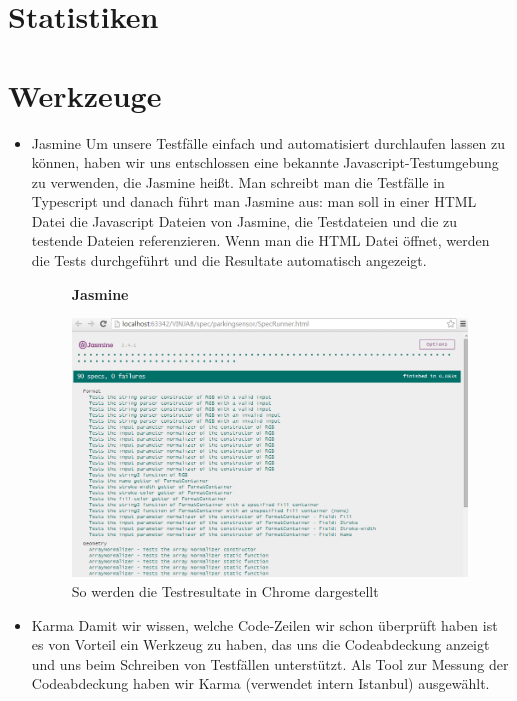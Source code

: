\documentclass[qualitaetssicherung.tex]{subfiles}
\begin{document}
\section{Statistiken}\label{statistiken}
\section{Werkzeuge}\label{werkzeuge}
\begin{itemize}
	\item

	Jasmine\newline	
	Um unsere Testfälle einfach und automatisiert durchlaufen lassen zu können, haben wir uns entschlossen eine bekannte Javascript-Testumgebung zu verwenden, die Jasmine heißt. Man schreibt man die Testfälle in Typescript und danach führt man Jasmine aus: man soll in einer HTML Datei die Javascript Dateien von Jasmine, die Testdateien und die zu testende Dateien referenzieren. Wenn man die HTML Datei öffnet, werden die Tests durchgeführt und die Resultate automatisch angezeigt.
	
	\begin{figure}
    \textbf{Jasmine}\par\medskip
    \includegraphics[width=0.99\textwidth]{Images/jasmine-example.png}
    \caption{So werden die Testresultate in Chrome dargestellt}
	\end{figure}
	
	\item
	Karma\newline
	Damit wir wissen, welche Code-Zeilen wir schon überprüft haben ist es von Vorteil ein Werkzeug zu haben, das uns die Codeabdeckung anzeigt und uns beim Schreiben von Testfällen unterstützt. Als Tool zur Messung der Codeabdeckung haben wir Karma (verwendet intern Istanbul) ausgewählt.
	

\end{itemize}
\end{document}
